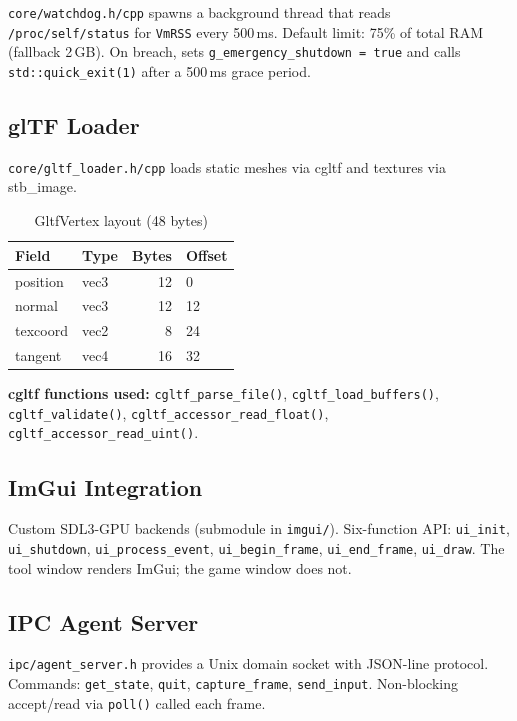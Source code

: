 \documentclass[11pt,a4paper]{article}
\begin{document}
\texttt{core/watchdog.h/cpp} spawns a background thread that reads \texttt{/proc/self/status} for \texttt{VmRSS} every 500\,ms. Default limit: 75\% of total RAM (fallback 2\,GB). On breach, sets \texttt{g\_emergency\_shutdown = true} and calls \texttt{std::quick\_exit(1)} after a 500\,ms grace period.

\subsection{glTF Loader}
\label{sec:gltf}

\texttt{core/gltf\_loader.h/cpp} loads static meshes via cgltf and textures via stb\_image.

\begin{table}[h]
\centering
\caption{GltfVertex layout (48 bytes)}
\begin{tabular}{@{}llrl@{}}
\toprule
\textbf{Field} & \textbf{Type} & \textbf{Bytes} & \textbf{Offset} \\
\midrule
position & vec3  & 12 & 0  \\
normal   & vec3  & 12 & 12 \\
texcoord & vec2  &  8 & 24 \\
tangent  & vec4  & 16 & 32 \\
\bottomrule
\end{tabular}
\end{table}

\textbf{cgltf functions used:} \texttt{cgltf\_parse\_file()}, \texttt{cgltf\_load\_buffers()}, \texttt{cgltf\_validate()}, \texttt{cgltf\_accessor\_read\_float()}, \texttt{cgltf\_accessor\_read\_uint()}.

\subsection{ImGui Integration}

Custom SDL3-GPU backends (submodule in \texttt{imgui/}). Six-function API: \texttt{ui\_init}, \texttt{ui\_shutdown}, \texttt{ui\_process\_event}, \texttt{ui\_begin\_frame}, \texttt{ui\_end\_frame}, \texttt{ui\_draw}. The tool window renders ImGui; the game window does not.

\subsection{IPC Agent Server}

\texttt{ipc/agent\_server.h} provides a Unix domain socket with JSON-line protocol. Commands: \texttt{get\_state}, \texttt{quit}, \texttt{capture\_frame}, \texttt{send\_input}. Non-blocking accept/read via \texttt{poll()} called each frame.
\end{document}
